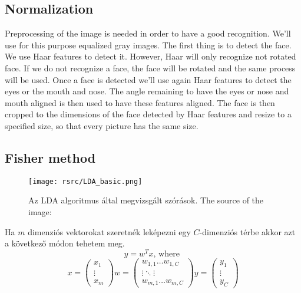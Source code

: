 \subsection{Normalization}
Preprocessing of the image is needed in order to have a good recognition. We'll use for this purpose equalized gray images. The first thing is to detect the face. We use Haar features to detect it. However, Haar will only recognize not rotated face. If we do not recognize a face, the face will be rotated and the same process will be used. Once a face is detected we'll use again Haar features to detect the eyes or the mouth and nose. The angle remaining to have the eyes or nose and mouth aligned is then used to have these features aligned. The face is then cropped to the dimensions of the face detected by Haar features and resize to a specified size, so that every picture has the same size.


\subsection{Fisher method}
\begin{figure}
	\centering		
	\texttt{[image: rsrc/LDA\_basic.png]}
	\caption{Az LDA algoritmus által megvizsgált szórások. The source of the image: \cite{LDA}}
	\label{fig:LDA abrazolas}
\end{figure}

Ha $ m $ dimenziós vektorokat szeretnék leképezni egy $ C $-dimenziós térbe akkor azt a következő módon tehetem meg.
\begin{equation}
y = w^Tx \textrm{, where } 
\end{equation}
\begin{equation}
x = \left(
\begin{array}{ccc}
x_1\\
\vdots\\
x_m
\end{array} \right)
w=\left(
\begin{array}{ccc}
w_{1,1} \dots w_{1,C}\\
\vdots \ddots \vdots\\
w_{m,1} \dots w_{m,C}
\end{array}
\right)
y = \left(
\begin{array}{ccc}
y_1\\
\vdots\\
y_C
\end{array}\right)
\label{equ:Alap_egyenlet}
\end{equation}

